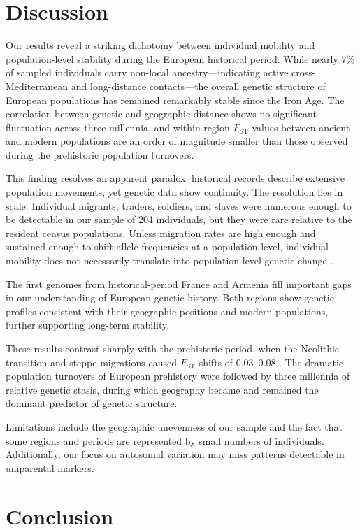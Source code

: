 \documentclass[11pt]{article}
\begin{document}
\section{Discussion}

Our results reveal a striking dichotomy between individual mobility and population-level stability during the European historical period. While nearly 7\% of sampled individuals carry non-local ancestry---indicating active cross-Mediterranean and long-distance contacts---the overall genetic structure of European populations has remained remarkably stable since the Iron Age. The correlation between genetic and geographic distance shows no significant fluctuation across three millennia, and within-region $F_\text{ST}$ values between ancient and modern populations are an order of magnitude smaller than those observed during the prehistoric population turnovers.

This finding resolves an apparent paradox: historical records describe extensive population movements, yet genetic data show continuity. The resolution lies in scale. Individual migrants, traders, soldiers, and slaves were numerous enough to be detectable in our sample of 204 individuals, but they were rare relative to the resident census populations. Unless migration rates are high enough and sustained enough to shift allele frequencies at a population level, individual mobility does not necessarily translate into population-level genetic change \citep{novembre2008genes}.

The first genomes from historical-period France and Armenia fill important gaps in our understanding of European genetic history. Both regions show genetic profiles consistent with their geographic positions and modern populations, further supporting long-term stability.

These results contrast sharply with the prehistoric period, when the Neolithic transition and steppe migrations caused $F_\text{ST}$ shifts of 0.03--0.08 \citep{haak2015massive}. The dramatic population turnovers of European prehistory were followed by three millennia of relative genetic stasis, during which geography became and remained the dominant predictor of genetic structure.

Limitations include the geographic unevenness of our sample and the fact that some regions and periods are represented by small numbers of individuals. Additionally, our focus on autosomal variation may miss patterns detectable in uniparental markers.

\section{Conclusion}
\end{document}
